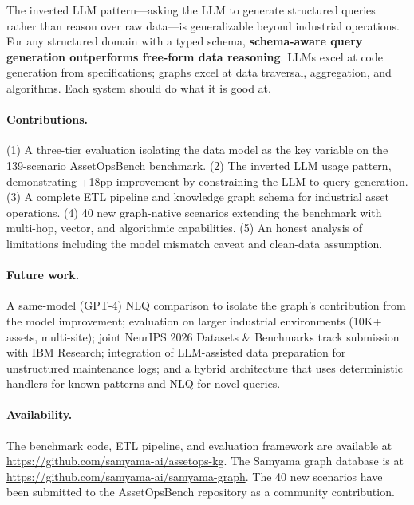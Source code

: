 \documentclass[11pt]{article}
\begin{document}
The inverted LLM pattern---asking the LLM to generate structured queries rather than reason over raw data---is generalizable beyond industrial operations. For any structured domain with a typed schema, \textbf{schema-aware query generation outperforms free-form data reasoning}. LLMs excel at code generation from specifications; graphs excel at data traversal, aggregation, and algorithms. Each system should do what it is good at.

\paragraph{Contributions.} (1) A three-tier evaluation isolating the data model as the key variable on the 139-scenario AssetOpsBench benchmark. (2) The inverted LLM usage pattern, demonstrating +18pp improvement by constraining the LLM to query generation. (3) A complete ETL pipeline and knowledge graph schema for industrial asset operations. (4) 40 new graph-native scenarios extending the benchmark with multi-hop, vector, and algorithmic capabilities. (5) An honest analysis of limitations including the model mismatch caveat and clean-data assumption.

\paragraph{Future work.} A same-model (GPT-4) NLQ comparison to isolate the graph's contribution from the model improvement; evaluation on larger industrial environments (10K+ assets, multi-site); joint NeurIPS 2026 Datasets \& Benchmarks track submission with IBM Research; integration of LLM-assisted data preparation for unstructured maintenance logs; and a hybrid architecture that uses deterministic handlers for known patterns and NLQ for novel queries.

\paragraph{Availability.} The benchmark code, ETL pipeline, and evaluation framework are available at \url{https://github.com/samyama-ai/assetops-kg}. The Samyama graph database is at \url{https://github.com/samyama-ai/samyama-graph}. The 40 new scenarios have been submitted to the AssetOpsBench repository as a community contribution.



\end{document}
